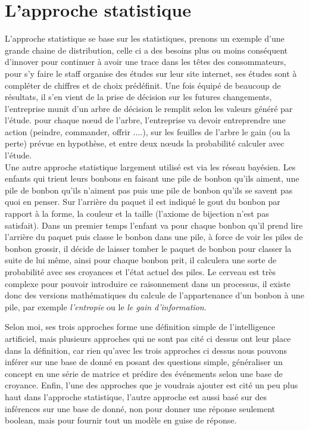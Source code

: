 \section{L'approche statistique}

L'approche statistique se base sur les statistiques, prenons un exemple d'une grande chaine de distribution, celle ci a des besoins plus ou moins conséquent d'innover pour continuer à avoir une trace dans les têtes des consommateurs, pour s'y faire le staff organise des études sur leur site internet, ses études sont à compléter de chiffres et de choix prédéfinit. Une fois équipé de beaucoup de résultats, il s'en vient de la prise de décision sur les futures changements, l'entreprise munit d'un arbre de décision le remplit selon les valeurs généré par l'étude. pour chaque nœud de l'arbre, l'entreprise va devoir entreprendre une action (peindre, commander, offrir ....), sur les feuilles de l'arbre le gain (ou la perte) prévue en hypothèse, et entre deux nœuds la probabilité calculer avec l'étude.\\
\linebreak
Une autre approche statistique largement utilisé est via les réseau bayésien. Les enfants qui trient leurs bonbons en faisant une pile de bonbon qu'ils aiment, une pile de bonbon qu'ils n'aiment pas puis une pile de bonbon qu'ils se savent pas quoi en penser. Sur l'arrière du paquet il est indiqué le gout du bonbon par rapport à la forme, la couleur et la taille (l'axiome de bijection n'est pas satisfait). Dans un premier temps l'enfant va pour chaque bonbon qu'il prend lire l'arrière du paquet puis classe le bonbon dans une pile, à force de voir les piles de bonbon grossir, il décide de laisser tomber le paquet de bonbon pour classer la suite de lui même, ainsi pour chaque bonbon prit, il calculera une sorte de probabilité avec ses croyances et l'état actuel des piles. Le cerveau est très complexe pour pouvoir introduire ce raisonnement dans un processus, il existe donc des versions mathématiques du calcule de l'appartenance d'un bonbon à une pile, par exemple \textit{l'entropie} ou le \textit{le gain d'information}.\\

\pagebreak

Selon moi, ses trois approches forme une définition simple de l'intelligence artificiel, mais plusieurs approches qui ne sont pas cité ci dessus ont leur place dans la définition, car rien qu'avec les trois approches ci dessus nous pouvons inférer sur une base de donné en posant des questions simple, généraliser un concept en une série de matrice et prédire des événements selon une base de croyance. Enfin, l'une des approches que je voudrais ajouter est cité un peu plus haut dans l'approche statistique, l'autre approche est aussi basé sur des inférences sur une base de donné, non pour donner une réponse seulement boolean, mais pour fournir tout un modèle en guise de réponse.

